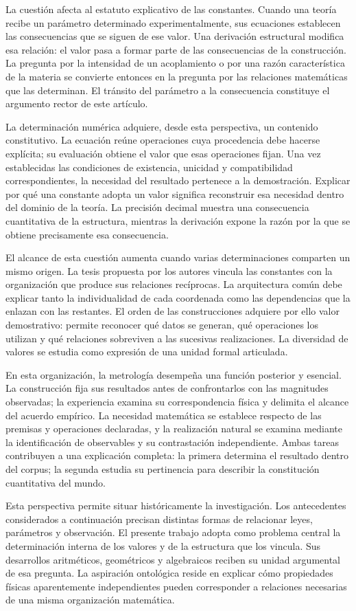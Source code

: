 La cuestión afecta al estatuto explicativo de las constantes. Cuando una
teoría recibe un parámetro determinado experimentalmente, sus ecuaciones
establecen las consecuencias que se siguen de ese valor. Una derivación
estructural modifica esa relación: el valor pasa a formar parte de las
consecuencias de la construcción. La pregunta por la intensidad de un
acoplamiento o por una razón característica de la materia se convierte
entonces en la pregunta por las relaciones matemáticas que las determinan.
El tránsito del parámetro a la consecuencia constituye el argumento rector
de este artículo.

La determinación numérica adquiere, desde esta perspectiva, un contenido
constitutivo. La ecuación reúne operaciones cuya procedencia debe hacerse
explícita; su evaluación obtiene el valor que esas operaciones fijan. Una
vez establecidas las condiciones de existencia, unicidad y compatibilidad
correspondientes, la necesidad del resultado pertenece a la demostración.
Explicar por qué una constante adopta un valor significa reconstruir esa
necesidad dentro del dominio de la teoría. La precisión decimal muestra
una consecuencia cuantitativa de la estructura, mientras la derivación
expone la razón por la que se obtiene precisamente esa consecuencia.

El alcance de esta cuestión aumenta cuando varias determinaciones
comparten un mismo origen. La tesis propuesta por los autores vincula
las constantes con la organización que produce sus relaciones recíprocas.
La arquitectura común debe explicar tanto la individualidad de cada
coordenada como las dependencias que la enlazan con las restantes.
El orden de las construcciones adquiere por ello valor demostrativo:
permite reconocer qué datos se generan, qué operaciones los utilizan y
qué relaciones sobreviven a las sucesivas realizaciones. La diversidad
de valores se estudia como expresión de una unidad formal articulada.

En esta organización, la metrología desempeña una función posterior y
esencial. La construcción fija sus resultados antes de confrontarlos con
las magnitudes observadas; la experiencia examina su correspondencia
física y delimita el alcance del acuerdo empírico. La necesidad matemática se establece
respecto de las premisas y operaciones declaradas, y la realización
natural se examina mediante la identificación de observables y su
contrastación independiente. Ambas tareas contribuyen a una explicación
completa: la primera determina el resultado dentro del corpus; la segunda
estudia su pertinencia para describir la constitución cuantitativa del
mundo.

Esta perspectiva permite situar históricamente la investigación. Los
antecedentes considerados a continuación precisan distintas formas de
relacionar leyes, parámetros y observación. El presente trabajo adopta
como problema central la determinación interna de los valores y de la
estructura que los vincula. Sus desarrollos aritméticos, geométricos y
algebraicos reciben su unidad argumental de esa pregunta. La aspiración
ontológica reside en explicar cómo propiedades físicas aparentemente
independientes pueden corresponder a relaciones necesarias de una misma
organización matemática.
